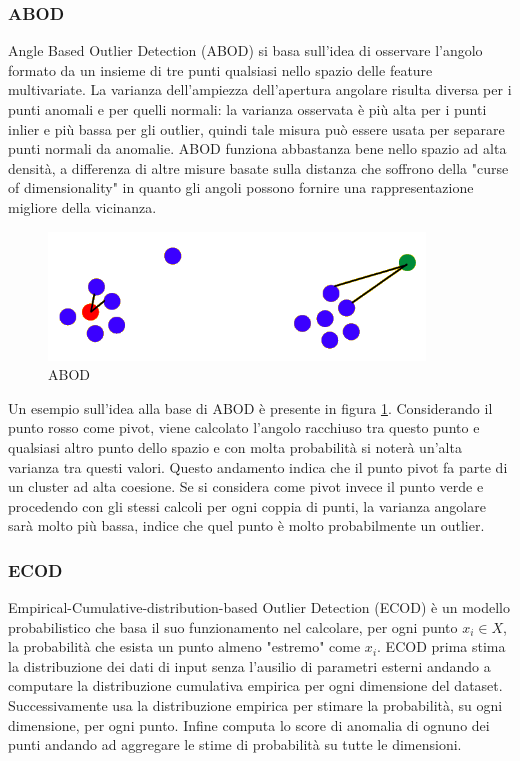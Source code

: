 \subsubsection{ABOD}
Angle Based Outlier Detection (ABOD) \cite{kriegel2008angle} si basa sull'idea di osservare l'angolo formato da un insieme di tre punti qualsiasi nello spazio delle feature multivariate. La varianza dell'ampiezza dell'apertura angolare risulta diversa per i punti anomali e per quelli normali: la varianza osservata è più alta per i punti inlier e più bassa per gli outlier, quindi tale misura può essere usata per separare punti normali da anomalie. ABOD funziona abbastanza bene nello spazio ad alta densità, a differenza di altre misure basate sulla distanza che soffrono della "curse of dimensionality" in quanto gli angoli possono fornire una rappresentazione migliore della vicinanza.
\begin{figure}[t]
	\centering
	\includegraphics[width=10cm, scale=1]{images/abod}
	\caption{ABOD}
	\label{abod}
\end{figure}
Un esempio sull'idea alla base di ABOD è presente in figura \ref{abod}.
Considerando il punto rosso come pivot, viene calcolato l'angolo racchiuso tra questo punto e qualsiasi altro punto dello spazio e con molta probabilità si noterà un'alta varianza tra questi valori. Questo andamento indica che il punto pivot fa parte di un cluster ad alta coesione.
Se si considera come pivot invece il punto verde e procedendo con gli stessi calcoli per ogni coppia di punti, la varianza angolare sarà molto più bassa, indice che quel punto è molto probabilmente un outlier.

\subsubsection{ECOD}
Empirical-Cumulative-distribution-based Outlier Detection (ECOD) \cite{li2021ecod} è un modello probabilistico che basa il suo funzionamento nel calcolare, per ogni punto $x_i \in X$, la probabilità che esista un punto almeno "estremo" come $x_i$.
ECOD prima stima la distribuzione dei dati di input senza l'ausilio di parametri esterni andando a computare la distribuzione cumulativa empirica per ogni dimensione del dataset. Successivamente usa la distribuzione empirica per stimare la probabilità, su ogni dimensione, per ogni punto. Infine computa lo score di anomalia di ognuno dei punti andando ad aggregare le stime di probabilità su tutte le dimensioni.


